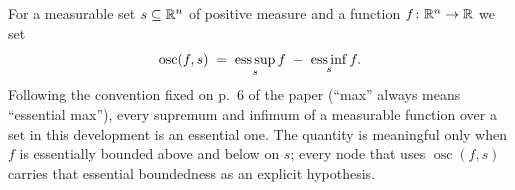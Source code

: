 \begin{definition}
For a measurable set $s\subseteq\mathbb{R}^n$ of positive measure and a function
$f\colon\mathbb{R}^n\to\mathbb{R}$ we set
\[
\operatorname*{osc}(f,s)\;=\;\operatorname*{ess\,sup}_{s} f\;-\;\operatorname*{ess\,inf}_{s} f .
\]
Following the convention fixed on p.~6 of the paper (``max'' always means
``essential max''), every supremum and infimum of a measurable function over a
set in this development is an essential one.  The quantity is meaningful only
when $f$ is essentially bounded above and below on $s$; every node that uses
$\operatorname*{osc}(f,s)$ carries that essential boundedness as an explicit
hypothesis.
\end{definition}
